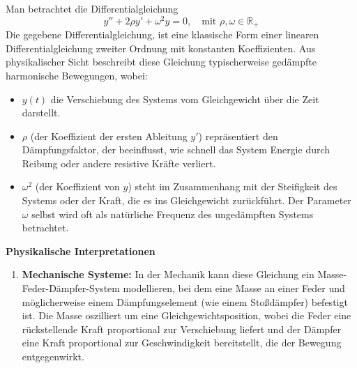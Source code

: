 {
Man betrachtet die Differentialgleichung
\[
y'' + 2\rho y' + \omega^2 y = 0, \quad \text{mit } \rho, \omega \in \mathbb R_+
\]
Die gegebene Differentialgleichung, ist eine klassische Form einer linearen Differentialgleichung zweiter Ordnung mit konstanten Koeffizienten. Aus physikalischer Sicht beschreibt diese Gleichung typischerweise gedämpfte harmonische Bewegungen, wobei:
\begin{itemize}
  \item \( y(t) \) die Verschiebung des Systems vom Gleichgewicht über die Zeit darstellt.
  \item \( \rho \) (der Koeffizient der ersten Ableitung \( y' \)) repräsentiert den Dämpfungsfaktor, der beeinflusst, wie schnell das System Energie durch Reibung oder andere resistive Kräfte verliert.
  \item \( \omega^2 \) (der Koeffizient von \( y \)) steht im Zusammenhang mit der Steifigkeit des Systems oder der Kraft, die es ins Gleichgewicht zurückführt. Der Parameter \( \omega \) selbst wird oft als natürliche Frequenz des ungedämpften Systems betrachtet.
\end{itemize}

\textbf{Physikalische Interpretationen}
\begin{enumerate}
  \item \textbf{Mechanische Systeme:} In der Mechanik kann diese Gleichung ein Masse-Feder-Dämpfer-System modellieren, bei dem eine Masse an einer Feder und möglicherweise einem Dämpfungselement (wie einem Stoßdämpfer) befestigt ist. Die Masse oszilliert um eine Gleichgewichtsposition, wobei die Feder eine rückstellende Kraft proportional zur Verschiebung liefert und der Dämpfer eine Kraft proportional zur Geschwindigkeit bereitstellt, die der Bewegung entgegenwirkt.

\begin{center}
\end{center}
\end{enumerate}}
